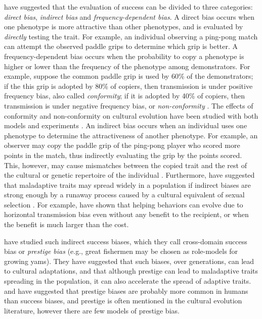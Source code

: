 \documentclass[12pt]{extarticle}
\begin{document}
\citet[Ch.~5]{evolutionBook} have suggested that the evaluation of success can be divided to three categories: \emph{direct bias}, \emph{indirect bias} and \emph{frequency-dependent bias}.
A direct bias occurs when one phenotype is more attractive than other phenotypes, and is evaluated by \emph{directly} testing the trait.
For example, an individual observing a ping-pong match can attempt the observed paddle grips to determine which grip is better.
A frequency-dependent bias occurs when the probability to copy a phenotype is higher or lower than the frequency of the phenotype among demonstrators. 
For example, suppose the common paddle grip is used by 60\% of the demonstrators; if the this grip is adopted by 80\% of copiers, then transmission is under positive frequency bias, also called \emph{conformity}; if it is adopted by 40\% of copiers, then transmission is under negative frequency bias, or \emph{non-conformity} \citep{conformism}. 
The effects of conformity and non-conformity on cultural evolution have been studied with both models \citep{anticonformity,Denton2021,conformity} and experiments \citep{negativeFrequency}.
An indirect bias occurs when an individual uses one phenotype to determine the attractiveness of another phenotype.
For example, an observer may copy the paddle grip of the ping-pong player who scored more points in the match, thus indirectly evaluating the grip by the points scored.
This, however, may cause mismatches between the copied trait and the rest of the cultural or genetic repertoire of the individual \citep{Kolodny2022}.
Furthermore, \citet[Ch. 8]{evolutionBook} have suggested that maladaptive traits may spread widely in a population if indirect biases are strong enough by a runaway process caused by a cultural equivalent of sexual selection \citep{sexualSelectionBook}.
For example, \citet{cooperation} have shown that helping behaviors can evolve due to horizontal transmission bias even without any benefit to the recipient, or when the benefit is much larger than the cost.

\citet{fijian_social_bias} have studied such indirect success biases, which they call cross-domain success bias or \emph{prestige bias} (e.g., great fishermen may be chosen as role-models for growing yams). They have suggested that such biases, over generations, can lead to cultural adaptations, and that although prestige can lead to maladaptive traits spreading in the population, it can also accelerate the spread of adaptive traits.
\citet[Ch.~8]{evolutionBook} and \citet{complexityPaper} have suggested that prestige biases are probably more common in humans than success biases, and prestige is often mentioned in the cultural evolution literature, however there are few models of prestige bias.
\end{document}
